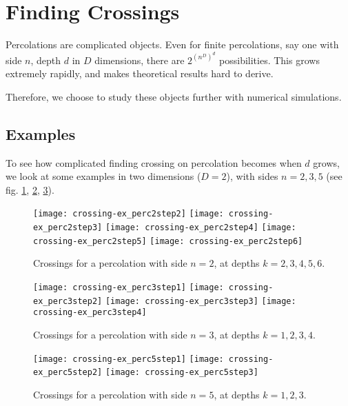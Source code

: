 \section{Finding Crossings}\label{finding_crossings}
Percolations are complicated objects.
Even for finite percolations, say one with side $n$, depth $d$ in $D$ dimensions, there are $2^{\left( n^D \right)^d}$ possibilities.
This grows extremely rapidly, and makes theoretical results hard to derive.

Therefore, we choose to study these objects further with numerical simulations.

\subsection{Examples}
To see how complicated finding crossing on percolation becomes when $d$ grows, we look at some examples in two dimensions ($D=2$), with sides $n=2,3,5$ (see fig. \ref{fig:crossingExPerc2}, \ref{fig:crossingExPerc3}, \ref{fig:crossingExPerc5}).
\begin{figure}[!h]
	\texttt{[image: crossing-ex\_perc2step2]}
	\hspace{0.1cm}
	\texttt{[image: crossing-ex\_perc2step3]}
	\hspace{0.1cm}
	\texttt{[image: crossing-ex\_perc2step4]}
	\hspace{0.1cm}
	\texttt{[image: crossing-ex\_perc2step5]}
	\hspace{0.1cm}
	\texttt{[image: crossing-ex\_perc2step6]}
	\centering
	\caption{Crossings for a percolation with side $n=2$, at depths $k=2,3,4,5,6$.}
	\label{fig:crossingExPerc2}
\end{figure}
\begin{figure}[!h]
	\texttt{[image: crossing-ex\_perc3step1]}
	\hspace{0.1cm}
	\texttt{[image: crossing-ex\_perc3step2]}
	\hspace{0.1cm}
	\texttt{[image: crossing-ex\_perc3step3]}
	\hspace{0.1cm}
	\texttt{[image: crossing-ex\_perc3step4]}
	\centering
	\caption{Crossings for a percolation with side $n=3$, at depths $k=1,2,3,4$.}
	\label{fig:crossingExPerc3}
\end{figure}
\begin{figure}[!h]
	\texttt{[image: crossing-ex\_perc5step1]}
	\hspace{0.9cm}
	\texttt{[image: crossing-ex\_perc5step2]}
	\hspace{0.9cm}
	\texttt{[image: crossing-ex\_perc5step3]}
	\centering
	\caption{Crossings for a percolation with side $n=5$, at depths $k=1,2,3$.}
	\label{fig:crossingExPerc5}
\end{figure}

